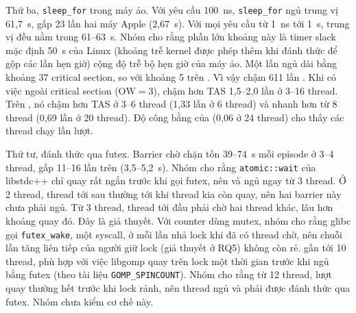 Thứ ba, \texttt{sleep\_for} trong máy ảo. Với yêu cầu 100~ns, \texttt{sleep\_for} ngủ trung vị
61,7~\textmu s, gấp 23 lần hai máy Apple (2,67~\textmu s). Với mọi yêu cầu từ 1~ns tới 1~\textmu s, trung
vị đều nằm trong 61--63~\textmu s. Nhóm cho rằng phần lớn khoảng này là timer slack mặc định 50~\textmu s
của Linux (khoảng trễ kernel được phép thêm khi đánh thức để gộp các lần hẹn giờ) cộng độ trễ bộ hẹn giờ
của máy ảo. Một lần ngủ dài bằng khoảng 37 critical section, so với khoảng 5 trên . Vì vậy
 chậm 611 lần . Khi có việc ngoài critical section ($\mathrm{OW} = 3$),
 chậm hơn TAS 1,5--2,0 lần ở 3--16 thread. Trên , nó chậm hơn TAS ở
3--6 thread (1,33 lần ở 6 thread) và nhanh hơn từ 8 thread (0,69 lần ở 20 thread). Độ công bằng của
 (0,06 ở 24 thread) cho thấy các thread chạy lần lượt.

Thứ tư, đánh thức qua futex. Barrier chờ chặn tốn 39--74~\textmu s mỗi episode ở 3--4 thread, gấp 11--16
lần  trên  (3,5--5,2~\textmu s). Nhóm cho rằng \texttt{atomic::wait} của
libstdc++ chỉ quay rất ngắn trước khi gọi futex, nên  và  ngủ ngay từ
3 thread. Ở 2 thread, thread tới sau thường tới khi thread kia còn quay, nên hai barrier này chưa phải ngủ.
Từ 3 thread, thread tới đầu phải chờ hai thread khác, lâu hơn khoảng quay đó. Đây là giả thuyết. Với
counter dùng mutex, nhóm cho rằng glibc gọi \texttt{futex\_wake}, một syscall, ở mỗi lần nhả lock khi đã
có thread chờ, nên chuỗi lần tăng liên tiếp của người giữ lock (giả thuyết ở RQ5) không còn rẻ.
 gần  tới 10 thread, phù hợp với việc libgomp quay trên lock một thời
gian trước khi ngủ bằng futex (theo tài liệu \texttt{GOMP\_SPINCOUNT}). Nhóm cho rằng từ 12 thread, lượt
quay thường hết trước khi lock rảnh, nên thread ngủ và phải được đánh thức qua futex. Nhóm chưa kiểm cơ chế
này.

